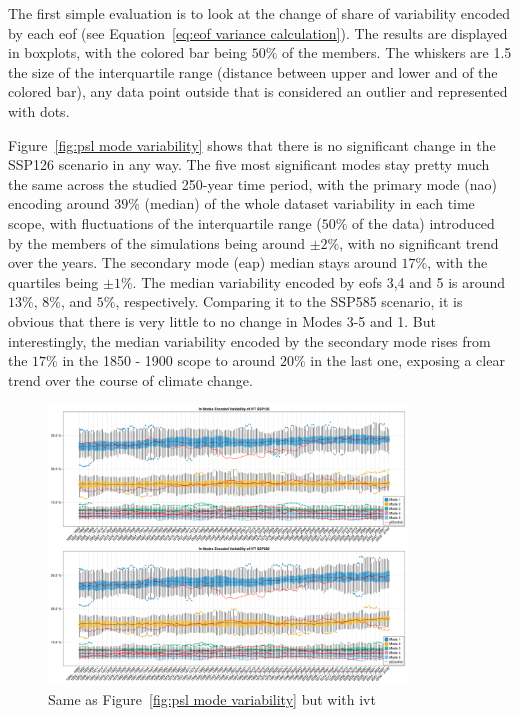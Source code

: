 The first simple evaluation is to look at the change of share of variability encoded by each \ac{eof} (see Equation~\ref{eq:eof variance calculation}). 
The results are displayed in boxplots, with the colored bar being $50\%$  of the members. 
The whiskers are 1.5 the size of the interquartile range (distance between upper and lower and of the colored bar), any data point outside that is considered an outlier and represented with dots. 


Figure~\ref{fig:psl mode variability} shows that there is no significant change in the SSP126 scenario in any way. 
The five most significant modes stay pretty much the same across the studied 250-year time period, with the primary mode (\ac{nao}) encoding around $39\%$ (median) of the whole dataset variability in each time scope, with fluctuations of the interquartile range ($50\%$ of the data) introduced by the members of the simulations being around $\pm 2\%$, with no significant trend over the years. 
The secondary mode (\ac{eap}) median stays around $17\%$, with the quartiles being $\pm 1\%$. 
The median variability encoded by \acp{eof} 3,4 and 5 is around $13\%$, $8\%$, and $5\%$, respectively. 
Comparing it to the SSP585 scenario, it is obvious that there is very little to no change in Modes 3-5 and 1. 
But interestingly, the median variability encoded by the secondary mode rises from the $17\%$ in the 1850 - 1900 scope to around $20\%$ in the last one, exposing a clear trend over the course of climate change.   


\begin{figure}[hbt]
  \begin{center}
    \includegraphics[width=0.85\textwidth]{figures/mode_variability_ivt_50seasons.png}
  \end{center}
  \caption{Same as Figure~\ref{fig:psl mode variability} but with \ac{ivt}}\label{fig:ivt mode variability}
\end{figure}

